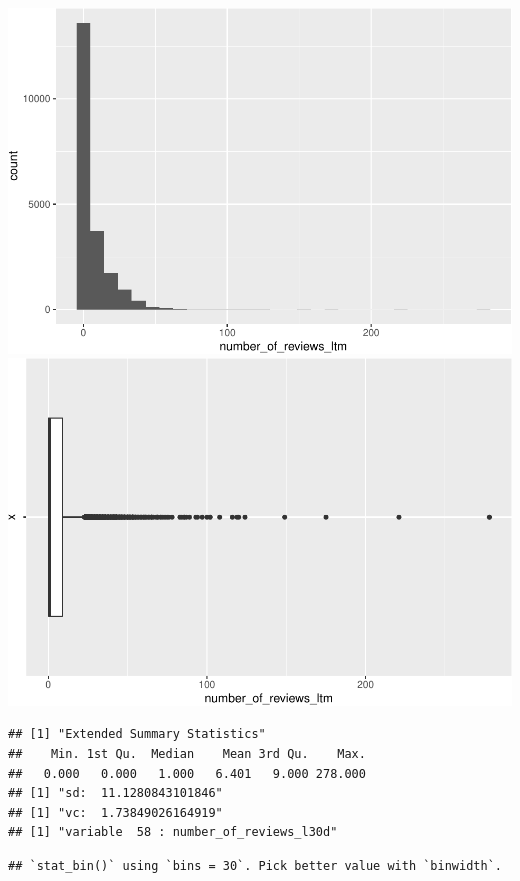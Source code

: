 \includegraphics{anal_files/figure-latex/unnamed-chunk-9-38.pdf}
\includegraphics{anal_files/figure-latex/unnamed-chunk-9-39.pdf}

\begin{verbatim}
## [1] "Extended Summary Statistics"
##    Min. 1st Qu.  Median    Mean 3rd Qu.    Max. 
##   0.000   0.000   1.000   6.401   9.000 278.000 
## [1] "sd:  11.1280843101846"
## [1] "vc:  1.73849026164919"
## [1] "variable  58 : number_of_reviews_l30d"
\end{verbatim}

\begin{verbatim}
## `stat_bin()` using `bins = 30`. Pick better value with `binwidth`.
\end{verbatim}

